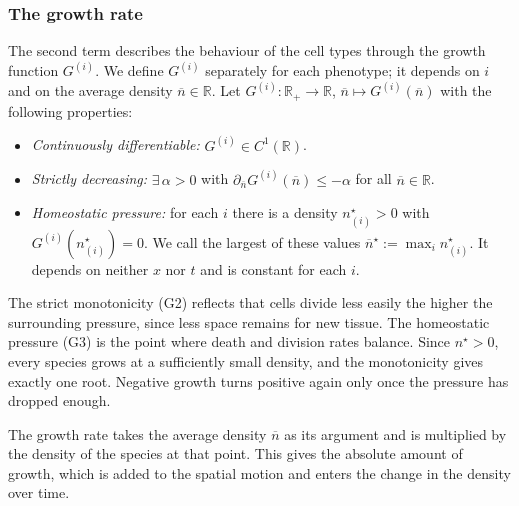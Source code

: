 \documentclass[11pt]{article}
\newcommand{\nbar}{\overline{n}}
\begin{document}
\subsubsection{The growth rate}
The second term describes the behaviour of the cell types through the growth
function $G^{(i)}$. We define $G^{(i)}$ separately for each phenotype; it depends
on $i$ and on the average density $\nbar \in \mathbb{R}$. Let $G^{(i)} \colon
\mathbb{R}_+ \to \mathbb{R}$, $\nbar \mapsto G^{(i)}(\nbar)$ with the following
properties:
\begin{itemize}
    \item[(G1)] \emph{Continuously differentiable:} $G^{(i)} \in C^1(\mathbb{R})$.
    \item[(G2)] \emph{Strictly decreasing:} $\exists\, \alpha > 0$ with
    $\partial_{\nbar} G^{(i)}(\nbar) \le -\alpha$ for all $\nbar \in \mathbb{R}$.
    \item[(G3)] \emph{Homeostatic pressure:} for each $i$ there is a density
    $n^{\star}_{(i)} > 0$ with $G^{(i)}(n^{\star}_{(i)}) = 0$. We call the largest
    of these values $\nbar^{\star} := \max_{i} n^{\star}_{(i)}$. It depends on
    neither $x$ nor $t$ and is constant for each $i$.
\end{itemize}
The strict monotonicity (G2) reflects that cells divide less easily the higher the
surrounding pressure, since less space remains for new tissue. The homeostatic
pressure (G3) is the point where death and division rates balance. Since
$n^{\star} > 0$, every species grows at a sufficiently small density, and the
monotonicity gives exactly one root. Negative growth turns positive again only
once the pressure has dropped enough.

The growth rate takes the average density $\nbar$ as its argument and is
multiplied by the density of the species at that point. This gives the absolute
amount of growth, which is added to the spatial motion and enters the change in
the density over time.
\end{document}
